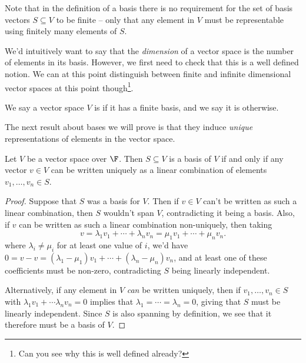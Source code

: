 \begin{remark}
    Note that in the definition of a basis there is no requirement for the set of basis vectors $S \subseteq V$ to be finite -- only that any element in $V$ must be representable using finitely many elements of $S$. 
\end{remark}

We'd intuitively want to say that the \emph{dimension} of a vector space is the number of elements in its basis. However, we first need to check that this is a well defined notion.
We can at this point distinguish between finite and infinite dimensional vector spaces at this point though\footnote{Can you see why this is well defined already?}.

\begin{definition}
    We say a vector space $V$ is  if it has a finite basis, and we say it is  otherwise.
\end{definition}

The next result about bases we will prove is that they induce \emph{unique} representations of elements in the vector space.

\begin{lemma}
    Let $V$ be a vector space over $\F$. Then $S \subseteq V$ is a basis of $V$ if and only if any vector $v \in V$ can be written uniquely as a linear combination of elements $v_1, \dots, v_n \in S$.
\end{lemma}
\begin{proof}
    Suppose that $S$ was a basis for $V$.
    Then if $v \in V$ can't be written as such a linear combination, then $S$ wouldn't span $V$, contradicting it being a basis.
    Also, if $v$ can be written as such a linear combination non-uniquely, then taking
    $$
v = \lambda_1 v_1 + \cdots + \lambda_n v_n = \mu_1 v_1 + \cdots + \mu_n v_n.
    $$
    where $\lambda_i \neq \mu_i$ for at least one value of $i$, we'd have
    $0 = v - v = (\lambda_1 - \mu_1) v_1 + \cdots + (\lambda_n - \mu_n)v_n$,
    and at least one of these coefficients must be non-zero, contradicting $S$ being linearly independent.

    Alternatively, if any element in $V$ \emph{can} be written uniquely, then if $v_1, \dots, v_n \in S$ with $\lambda_1 v_1 + \cdots \lambda_n v_n = 0$ implies that $\lambda_1 = \cdots = \lambda_n = 0$, giving that $S$ must be linearly independent. Since $S$ is also spanning by definition, we see that it therefore must be a basis of $V$.
\end{proof}

